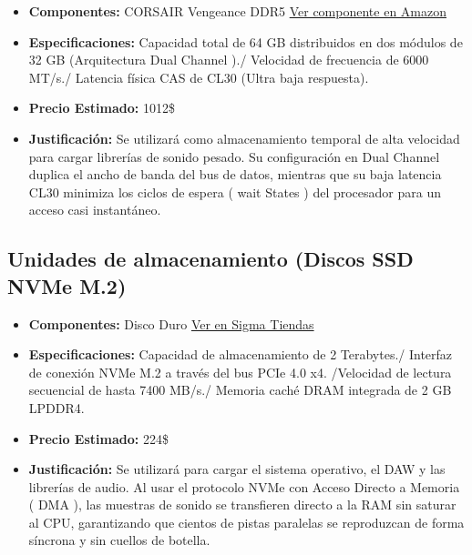 \documentclass[12pt,a4paper]{article}
\begin{document}
\begin{itemize}
    \item \textbf{Componentes:} CORSAIR Vengeance DDR5
    \href{https://www.amazon.es/CORSAIR-Vengeance-6000MHz-Compatible-Ordenadores/dp/B0C5M7J967?th=1}{Ver componente en Amazon}
    \item \textbf{Especificaciones:} Capacidad total de 64 GB distribuidos en dos módulos de 32 GB (Arquitectura Dual Channel )./ Velocidad de frecuencia de 6000 MT/s./ Latencia física CAS de CL30 (Ultra baja respuesta).
    \item \textbf{Precio Estimado:} 1012\$
    \item \textbf{Justificación:} Se utilizará como almacenamiento temporal de alta velocidad para cargar librerías de sonido pesado. Su configuración en Dual Channel duplica el ancho de banda del bus de datos, mientras que su baja latencia CL30 minimiza los ciclos de espera ( wait States ) del procesador para un acceso casi instantáneo.
\end{itemize}

\subsection{Unidades de almacenamiento (Discos SSD NVMe M.2)}

\begin{itemize}
    \item \textbf{Componentes:} Disco Duro 
    \href{https://sigmatiendas.com/es-ve/products/ssd-interno-para-juegos-crucial-t500-2tb-gen4-nvme-m-2-hasta-7400-mb-s-compatible-con-laptop-y-escritorio-1-mo-adob}{Ver en Sigma Tiendas}
    \item \textbf{Especificaciones:} Capacidad de almacenamiento de 2 Terabytes./ Interfaz de conexión NVMe M.2 a través del bus PCIe 4.0 x4. /Velocidad de lectura secuencial de hasta 7400 MB/s./ Memoria caché DRAM integrada de 2 GB LPDDR4. 
    \item \textbf{Precio Estimado:} 224\$
    \item \textbf{Justificación:} Se utilizará para cargar el sistema operativo, el DAW y las librerías de audio. Al usar el protocolo NVMe con Acceso Directo a Memoria ( DMA ), las muestras de sonido se transfieren directo a la RAM sin saturar al CPU, garantizando que cientos de pistas paralelas se reproduzcan de forma síncrona y sin cuellos de botella.
\end{itemize}
\end{document}
